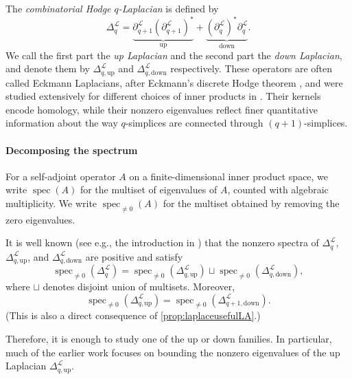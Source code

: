 \documentclass{article}
\newcommand{\LL}{\mathcal{L}}
\DeclareMathOperator*{\spec}{spec}
\begin{document}
The \emph{combinatorial Hodge $q$-Laplacian} is defined by
\[
\Delta_{q}^\LL=
\underbrace{\partial_{q+1}^\LL(\partial_{q+1}^\LL)^*}_{\text{up}} + \underbrace{(\partial_q^\LL)^* \partial_q^\LL}_{\text{down}}.
\]
We call the first part the \emph{ up Laplacian} and the second part the  \emph{down Laplacian}, and denote them by $\Delta_{q, \text{up}}^\LL$ and $\Delta_{q, \text{down}}^\LL$ respectively. These operators are often called Eckmann Laplacians, after Eckmann's discrete Hodge theorem \cite{MR0013318}, and were studied extensively for different choices of inner products in \cite{MR3077874}. Their kernels encode homology, while their nonzero eigenvalues reflect finer quantitative information about the way \(q\)-simplices are connected through \((q+1)\)-simplices. 
\paragraph{Decomposing the spectrum}
For a self-adjoint operator \(A\) on a finite-dimensional inner product space, we write $\spec(A)$ for the multiset of eigenvalues of \(A\), counted with algebraic multiplicity. We write $\spec_{\neq 0}(A)$
for the multiset obtained by removing the zero eigenvalues.

It is well known (see e.g., the introduction in \cite{MR3077874}) that the nonzero spectra of \(\Delta_q^\LL\), \(\Delta_{q,\mathrm{up}}^\LL\), and \(\Delta_{q,\mathrm{down}}^\LL\) are positive and satisfy
\[
\spec_{\neq 0}(\Delta_q^\LL)
=
\spec_{\neq 0}(\Delta_{q,\mathrm{up}}^\LL)
\sqcup
\spec_{\neq 0}(\Delta_{q,\mathrm{down}}^\LL),
\]
where \(\sqcup\) denotes disjoint union of multisets. Moreover,
\[
\spec_{\neq 0}(\Delta_{q,\mathrm{up}}^\LL)
=
\spec_{\neq 0}(\Delta_{q+1,\mathrm{down}}^\LL).
\]
(This is also a direct consequence of \cref{prop:laplaceusefulLA}.)

Therefore, it is enough to study one of the up or down families. In particular, much of the earlier work focuses on bounding the nonzero eigenvalues of the up Laplacian \(\Delta_{q,\mathrm{up}}^\LL\).
\end{document}
